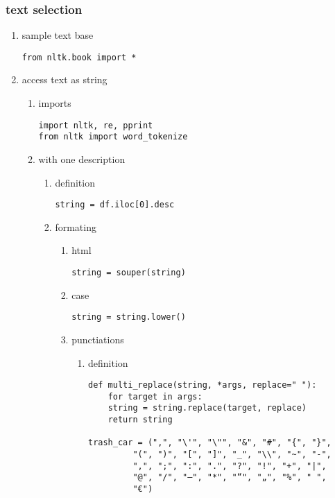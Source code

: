 \documentclass[11pt]{article}
\begin{document}
\subsubsection{text selection}
\label{sec:org67a5e09}
\begin{enumerate}
\item sample text base
\label{sec:org590abb9}
\begin{verbatim}
from nltk.book import *
\end{verbatim}
\item access text as string
\label{sec:orgff3ded8}
\begin{enumerate}
\item imports
\label{sec:orgae1a4ed}
\begin{verbatim}
import nltk, re, pprint
from nltk import word_tokenize
\end{verbatim}
\item with one description
\label{sec:org71ed3f2}
\begin{enumerate}
\item definition
\label{sec:org91ad4c8}
\begin{verbatim}
string = df.iloc[0].desc
\end{verbatim}

\item formating
\label{sec:orgaba2352}
\begin{enumerate}
\item html
\label{sec:orge6ac652}
\begin{verbatim}
string = souper(string)
\end{verbatim}

\item case
\label{sec:org71bf074}
\begin{verbatim}
string = string.lower()
\end{verbatim}

\item punctiations
\label{sec:org0dc4c74}

\begin{enumerate}
\item definition
\label{sec:org2c8e359}
\begin{verbatim}
def multi_replace(string, *args, replace=" "):
    for target in args:
	string = string.replace(target, replace)
    return string

trash_car = (",", "\'", "\"", "&", "#", "{", "}",
	     "(", ")", "[", "]", "_", "\\", "~", "-",
	     ",", ";", ":", ".", "?", "!", "+", "|",
	     "@", "/", "–", "*", "“", "„", "%", " ",
	     "€")


\end{verbatim}
\end{enumerate}
\end{enumerate}
\end{enumerate}
\end{enumerate}
\end{enumerate}
\end{document}
